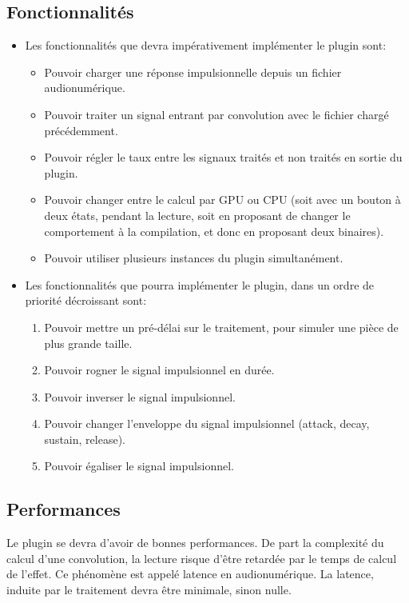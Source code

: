 \subsection{Fonctionnalités}
\begin{itemize}
    \item Les fonctionnalités que devra impérativement implémenter le plugin sont:
    \begin{itemize}
	\item Pouvoir charger une réponse impulsionnelle depuis un fichier audionumérique.
	\item Pouvoir traiter un signal entrant par convolution avec le fichier chargé précédemment.
	\item Pouvoir régler le taux entre les signaux traités et non traités en sortie du plugin.
	\item Pouvoir changer entre le calcul par GPU ou CPU (soit avec un bouton à deux états, pendant la lecture, soit en proposant de changer le comportement à la compilation, et donc en proposant deux binaires).
	\item Pouvoir utiliser plusieurs instances du plugin simultanément.
    \end{itemize}
    \item Les fonctionnalités que pourra implémenter le plugin, dans un ordre de priorité décroissant sont:
    \begin{enumerate}
	\item Pouvoir mettre un pré-délai sur le traitement, pour simuler une pièce de plus grande taille.
	\item Pouvoir rogner le signal impulsionnel en durée.
	\item Pouvoir inverser le signal impulsionnel.
	\item Pouvoir changer l'enveloppe du signal impulsionnel (attack, decay, sustain, release).
	\item Pouvoir égaliser le signal impulsionnel.
    \end{enumerate}
\end{itemize}
\subsection{Performances}
Le plugin se devra d'avoir de bonnes performances. De part la complexité du calcul d'une convolution, la lecture risque d'être retardée par le temps de calcul de l'effet. Ce phénomène est appelé latence en audionumérique.  La latence, induite par le traitement devra être minimale, sinon nulle.

